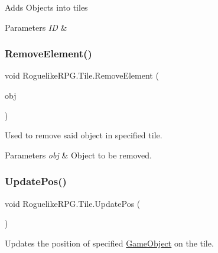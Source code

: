 Adds Objects into tiles 


\begin{DoxyParams}{Parameters}
{\em ID} & \\
\hline
\end{DoxyParams}
\mbox{\label{class_roguelike_r_p_g_1_1_tile_a84a16dca9f4ac818eca0eb58f7c5418b}} 
\subsubsection{\texorpdfstring{Remove\+Element()}{RemoveElement()}}
{\footnotesize\ttfamily void Roguelike\+R\+P\+G.\+Tile.\+Remove\+Element (\begin{DoxyParamCaption}\item[{\mbox{\hyperlink{class_roguelike_r_p_g_1_1_game_object}{Game\+Object}}}]{obj }\end{DoxyParamCaption})\hspace{0.3cm}{\ttfamily [inline]}}



Used to remove said object in specified tile. 


\begin{DoxyParams}{Parameters}
{\em obj} & Object to be removed.\\
\hline
\end{DoxyParams}
\mbox{\label{class_roguelike_r_p_g_1_1_tile_a48756f2f22db20e7c765c0d56f5a36f3}} 
\subsubsection{\texorpdfstring{Update\+Pos()}{UpdatePos()}}
{\footnotesize\ttfamily void Roguelike\+R\+P\+G.\+Tile.\+Update\+Pos (\begin{DoxyParamCaption}{ }\end{DoxyParamCaption})\hspace{0.3cm}{\ttfamily [inline]}}



Updates the position of specified \mbox{\hyperlink{class_roguelike_r_p_g_1_1_game_object}{Game\+Object}} on the tile. 



